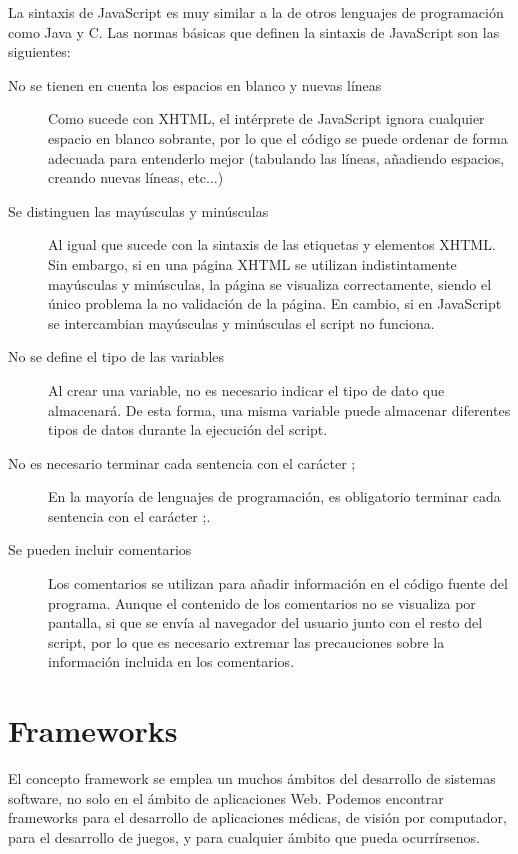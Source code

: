 La sintaxis de JavaScript es muy similar a la de otros lenguajes de programación como Java y C. Las normas básicas que definen la sintaxis de JavaScript son las siguientes:
\begin{description}
    \item[No se tienen en cuenta los espacios en blanco y nuevas líneas] Como sucede con XHTML, el intérprete de JavaScript ignora cualquier espacio en blanco sobrante, por lo que el código se puede ordenar de forma adecuada para entenderlo mejor (tabulando las líneas, añadiendo espacios, creando nuevas líneas, etc...)
    
    \item[Se distinguen las mayúsculas y minúsculas] Al igual que sucede con la sintaxis de las etiquetas y elementos XHTML. Sin embargo, si en una página XHTML se utilizan indistintamente mayúsculas y minúsculas, la página se visualiza correctamente, siendo el único problema la no validación de la página. En cambio, si en JavaScript se intercambian mayúsculas y minúsculas el script no funciona.
    
    \item[No se define el tipo de las variables] Al crear una variable, no es necesario indicar el tipo de dato que almacenará. De esta forma, una misma variable puede almacenar diferentes tipos de datos durante la ejecución del script.
    
    \item[No es necesario terminar cada sentencia con el carácter ;] En la mayoría de lenguajes de programación, es obligatorio terminar cada sentencia con el carácter ;. 
        
    \item[Se pueden incluir comentarios] Los comentarios se utilizan para añadir información en el código fuente del programa. Aunque el contenido de los comentarios no se visualiza por pantalla, si que se envía al navegador del usuario junto con el resto del script, por lo que es necesario extremar las precauciones sobre la información incluida en los comentarios.
\end{description}

\section{Frameworks}

El concepto framework se emplea un muchos ámbitos del desarrollo de sistemas software, no solo en el ámbito de aplicaciones Web. Podemos encontrar frameworks para el desarrollo de aplicaciones médicas, de visión por computador, para el desarrollo de juegos, y para cualquier ámbito que pueda ocurrírsenos.

